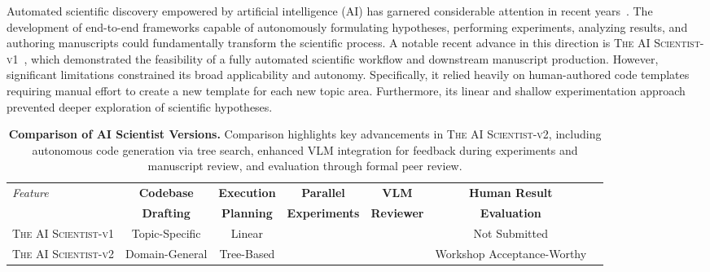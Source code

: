 \documentclass[11pt, a4paper]{include/gdm_format}
\newcommand{\cmark}{\ding{51}} %
\newcommand{\xmark}{\ding{55}} %
\newcommand{\oldalgo}{\textsc{The AI Scientist-v1}\xspace}
\newcommand{\ouralgo}{\textsc{The AI Scientist-v2}\xspace}
\begin{document}
Automated scientific discovery empowered by artificial intelligence (AI) has garnered considerable attention in recent years~\citep{Wang2023scientificdiscovery, king2009doi:10.1126/science.1165620, gil2014doi:10.1126/science.1259439, Kitano2021, Xu2021, Cornelio2023}.
The development of end-to-end frameworks capable of autonomously formulating hypotheses, performing experiments, analyzing results, and authoring manuscripts could fundamentally transform the scientific process.
A notable recent advance in this direction is \oldalgo~\citep{lu2024ai}, which demonstrated the feasibility of a fully automated scientific workflow and downstream manuscript production.
However, significant limitations constrained its broad applicability and autonomy.
Specifically, it relied heavily on human-authored code templates requiring manual effort to create a new template for each new topic area.
Furthermore, its linear and shallow experimentation approach prevented deeper exploration of scientific hypotheses.

\begin{table}[htbp]
    \centering
    \caption{\textbf{Comparison of AI Scientist Versions.} Comparison highlights key advancements in \ouralgo, including autonomous code generation via tree search, enhanced VLM integration for feedback during experiments and manuscript review, and evaluation through formal peer review.}
    \label{tab:ai-scientist-comparison}
    \begin{adjustbox}{width=\textwidth}
    \begin{tabular}{lcccccc}
        \toprule
\textit{Feature} & \textbf{Codebase} & \textbf{Execution} & \textbf{Parallel} & \textbf{VLM} & \textbf{Human Result} \\
        & \textbf{Drafting} & \textbf{Planning} & \textbf{Experiments} & \textbf{Reviewer}  & \textbf{Evaluation} \\
        \midrule
        \oldalgo & Topic-Specific & Linear & \xmark & \xmark & Not Submitted\\
        \rowcolor{gray!20}
        \ouralgo & Domain-General & Tree-Based & \cmark & \cmark & Workshop Acceptance-Worthy\\
        \bottomrule
    \end{tabular}
    \end{adjustbox}
\end{table}
\end{document}
